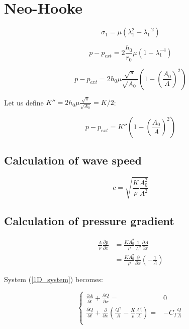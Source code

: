 \documentclass{config}
\begin{document}
\section{Neo-Hooke}\label{sec_NeoHooke}

\begin{equation}\label{sigmaNH}
\sigma_1 = \mu (\lambda_1^2 - \lambda_1^{-2})
\end{equation}

\begin{equation}
p- p_{ext} = 2 \frac{h_0}{r_0} \mu \left(1 - \lambda_1 ^{-4} \right)
\end{equation}

\begin{equation}
p - p_{ext} = 2 h_0 \mu \frac{\sqrt{\pi}}{\sqrt{A_0}} \left(1 -\left( \frac{A_0}{A}\right)^2\right)
\end{equation}

Let us define $\displaystyle K'' = 2h_0 \mu \frac{\sqrt{\pi}}{\sqrt{A_0}} = K/2$: 

\begin{equation}
p-p_{ext} = K''  \left(1 -\left( \frac{A_0}{A}\right)^2\right)
\end{equation}

\subsection{Calculation of wave speed}

\begin{equation}
c = \sqrt{\frac{K}{\rho} \frac{A_0^2 }{A^2}}
\end{equation}

\subsection{Calculation of pressure gradient }

\begin{align}
\frac{A}{ \rho}\frac{\partial p}{\partial x} & = \frac{K A_0^2}{\rho} \frac{1}{A^2} \frac{\partial A}{\partial x} \\
& = \frac{K A_0^2}{\rho} \frac{\partial}{\partial x}\left(-\frac{1}{A} \right)
\end{align}

System (\ref{1D_system}) becomes:

\begin{equation}
\left\{ 
\begin{array}{rl}
\displaystyle \frac{\partial A}{\partial t} + \frac{\partial Q}{\partial x} = &\displaystyle  0 \\
\displaystyle \frac{\partial Q}{\partial t} + \frac{\partial }{\partial x} \left( \frac{Q^2}{A} - \frac{K}{\rho} \frac{A_0^2}{A} \right) =& \displaystyle  - C_f \frac{Q}{A} \\
\end{array}\right.
\end{equation}
\end{document}
